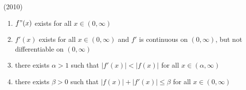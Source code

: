 		\hfill{(2010)}
		\begin{enumerate}
			\item $f"(x)$ exists for all $x\in(0,\infty)$
			\item $f'(x)$ exists for all $x\in(0,\infty)$ and $f'$ is continuous on $(0,\infty)$, but not differentiable on $(0,\infty)$
			\item there exists $\alpha>1$ such that $|f'(x)|<|f(x)|$ for all $x\in(\alpha,\infty)$
			\item there exists $\beta>0$ such that $|f(x)|+|f'(x)|\leq\beta$ for all $x\in(0,\infty)$
		\end{enumerate}







